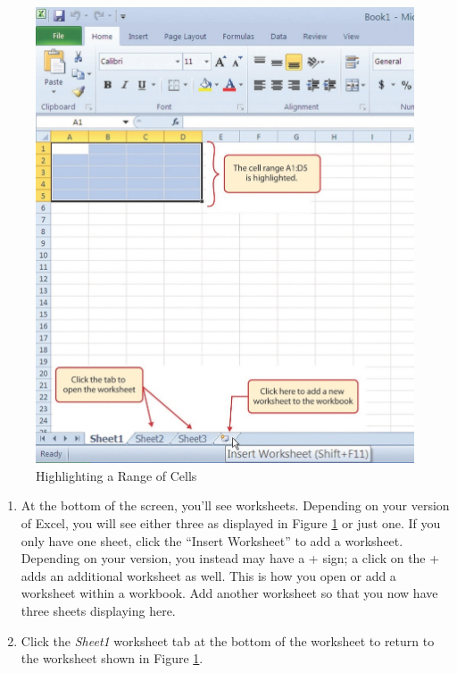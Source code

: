 \begin{figure}[H]
	\centering
	\includegraphics[width=\maxwidth{.95\linewidth}]{gfx/Ch01_fig05}
	\caption{Highlighting a Range of Cells}
	\label{01:fig05}
\end{figure}

\begin{enumerate}
	\item At the bottom of the screen, you'll see worksheets. Depending on your version of Excel, you will see either three as displayed in Figure \ref{01:fig05} or just one. If you only have one sheet, click the ``Insert Worksheet'' to add a worksheet. Depending on your version, you instead may have a \textsf{+} sign; a click on the \textsf{+} adds an additional worksheet as well. This is how you open or add a worksheet within a workbook. Add another worksheet so that you now have three sheets displaying here.
	\item Click the \textit{Sheet1} worksheet tab at the bottom of the worksheet to return to the worksheet shown in Figure \ref{01:fig05}.
\end{enumerate}

